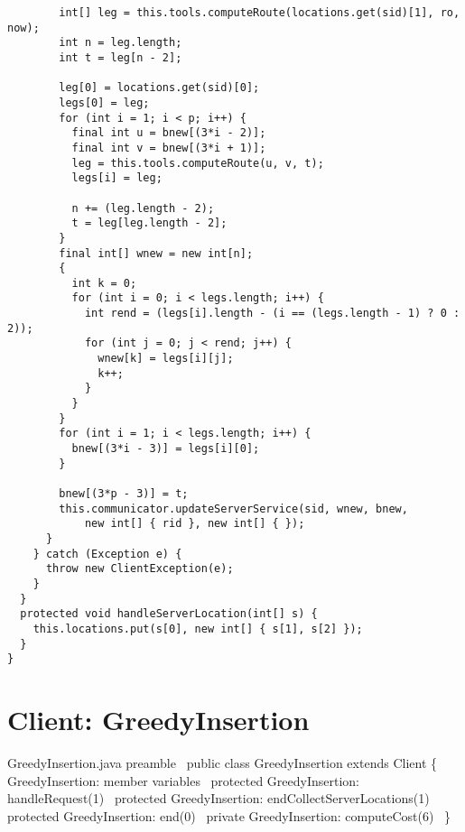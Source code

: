 {\begin{verbatim}
        int[] leg = this.tools.computeRoute(locations.get(sid)[1], ro, now);
        int n = leg.length;
        int t = leg[n - 2];

        leg[0] = locations.get(sid)[0];
        legs[0] = leg;
        for (int i = 1; i < p; i++) {
          final int u = bnew[(3*i - 2)];
          final int v = bnew[(3*i + 1)];
          leg = this.tools.computeRoute(u, v, t);
          legs[i] = leg;

          n += (leg.length - 2);
          t = leg[leg.length - 2];
        }
        final int[] wnew = new int[n];
        {
          int k = 0;
          for (int i = 0; i < legs.length; i++) {
            int rend = (legs[i].length - (i == (legs.length - 1) ? 0 : 2));
            for (int j = 0; j < rend; j++) {
              wnew[k] = legs[i][j];
              k++;
            }
          }
        }
        for (int i = 1; i < legs.length; i++) {
          bnew[(3*i - 3)] = legs[i][0];
        }

        bnew[(3*p - 3)] = t;
        this.communicator.updateServerService(sid, wnew, bnew,
            new int[] { rid }, new int[] { });
      }
    } catch (Exception e) {
      throw new ClientException(e);
    }
  }
  protected void handleServerLocation(int[] s) {
    this.locations.put(s[0], new int[] { s[1], s[2] });
  }
}
\end{verbatim}
}


\nwenddocs{}\chapter{Client: GreedyInsertion}
\label{client-greedy}

\nwenddocs{}\endmoddef\nwstartdeflinemarkup\nwenddeflinemarkup
\LA{}GreedyInsertion.java preamble~{\nwtagstyle{}}\RA{}
public class GreedyInsertion extends Client \{
  \LA{}GreedyInsertion: member variables~{\nwtagstyle{}}\RA{}
  protected \LA{}GreedyInsertion: handleRequest(1)~{\nwtagstyle{}}\RA{}
  protected \LA{}GreedyInsertion: endCollectServerLocations(1)~{\nwtagstyle{}}\RA{}
  protected \LA{}GreedyInsertion: end(0)~{\nwtagstyle{}}\RA{}
  private \LA{}GreedyInsertion: computeCost(6)~{\nwtagstyle{}}\RA{}
\}
\nwendcode{}\nwdocspar

